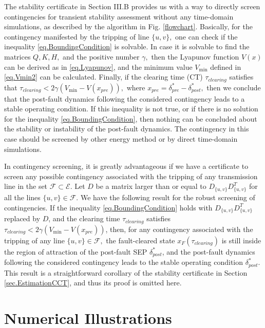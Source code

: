 \documentclass[final]{IEEEtran}
\begin{document}
The stability certificate in Section III.B provides us with a way
to directly screen contingencies for transient stability
assessment without any time-domain simulations, as described by
the algorithm in Fig. \ref{flowchart}. Basically, for the
contingency manifested by the tripping of line $\{u,v\},$ one can
check if the inequality \eqref{eq.BoundingCondition} is solvable.
In case it is solvable to find the matrices $Q,K,H,$ and the
positive number $\gamma,$ then the Lyapunov function $V(x)$ can be
derived as in \eqref{eq.Lyapunov}, and the minimum value
$V_{\min}$ defined in \eqref{eq.Vmin2} can be calculated. Finally,
if the clearing time (CT) $\tau_{clearing}$ satisfies that
$\tau_{clearing}<2\gamma (V_{\min}-V(x_{pre})),$ where
$x_{pre}=\delta^*_{pre}-\delta^*_{post},$ then we conclude that
the post-fault dynamics following the considered contingency leads
to a stable operating condition. If this inequality is not true,
or if there is no solution for the inequality
\eqref{eq.BoundingCondition}, then nothing can be concluded about
the stability or instability of the post-fault dynamics. The
contingency in this case should be screened by other energy method
or by direct time-domain simulations.






In contingency screening, it is greatly advantageous if we have a
certificate to screen any possible contingency associated with the
tripping of any transmission line in the set $\mathcal{F} \subset
\mathcal{E}$. Let $D$ be a matrix larger than or equal to
$D_{\{u,v\}}D_{\{u,v\}}^T$ for all the lines $\{u,v\}\in
\mathcal{F}.$ We have the following result for the robust
screening of contingencies. If the inequality
\eqref{eq.BoundingCondition} holds with $D_{\{u,v\}}D_{\{u,v\}}^T$
replaced by $D$, and the clearing time $\tau_{clearing}$ satisfies
$\tau_{clearing}< 2\gamma (V_{\min}-V(x_{pre}))$,  then, for any
contingency associated with the tripping of any line $\{u,v\}\in
\mathcal{F},$ the fault-cleared state $x_F(\tau_{clearing})$ is
still inside the region of attraction of the post-fault SEP
$\delta^*_{post}$, and the post-fault dynamics following the
considered contingency leads to the stable operating condition
$\delta^*_{post}$. This result is a straightforward corollary of
the stability certificate in Section \ref{sec.EstimationCCT}, and
thus its proof is omitted here.




\section{Numerical Illustrations}
\label{sec:simulations}
\end{document}

